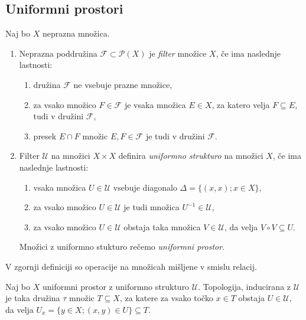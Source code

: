 \documentclass[mat1]{fmfdelo}
\begin{document}
\subsection{Uniformni prostori}

\begin{definicija}\label{def:uniform}
	Naj bo $X$ neprazna množica.
	\begin{enumerate}
		\item Neprazna poddružina $\mathcal{F} \subset \mathcal{P}(X)$ je \emph{filter} množice $X$, če ima naslednje lastnosti:
		\begin{enumerate}
			\item družina $\mathcal{F}$ ne vsebuje prazne množice,
			\item za vsako množico $F \in \mathcal{F}$ je vsaka množica $E \in X$, za katero velja $F \subseteq E$, tudi v družini $\mathcal{F}$,
			\item presek $E \cap F$ množic $E, F \in \mathcal{F}$ je tudi v družini $\mathcal{F}$.
		\end{enumerate}
		\item Filter $\mathcal{U}$ na množici $X \times X$ definira \emph{uniformno strukturo} na množici $X$, če ima naslednje lastnosti:
		\begin{enumerate}
			\item vsaka množica $U \in \mathcal{U}$ vsebuje diagonalo $\Delta = \lbrace (x, x) ; x \in X \rbrace$,
			\item za vsako množico $U \in \mathcal{U}$ je tudi množica $U^{-1} \in \mathcal{U}$,
			\item za vsako množico $U \in \mathcal{U}$ obstaja taka množica $V \in \mathcal{U}$, da velja $V \circ V \subseteq U$.
		\end{enumerate}
		Množici z uniformno stukturo rečemo \emph{uniformni prostor}.
	\end{enumerate}
\end{definicija}

\begin{opomba}
	V zgornji definiciji so operacije na množicah mišljene v smislu relacij.
\end{opomba}

\begin{definicija}\label{def:uniinduciranatopo}
	Naj bo $X$ uniformni prostor z uniformno strukturo $\mathcal{U}$. Topologija, inducirana z $\mathcal{U}$ je taka družina $\tau$ množic $T \subseteq X$, za katere za vsako točko $x \in T$ obstaja $U \in \mathcal{U}$, da velja $U_x = \lbrace y \in X ; (x, y) \in U \rbrace \subseteq T$.
\end{definicija}
\end{document}

